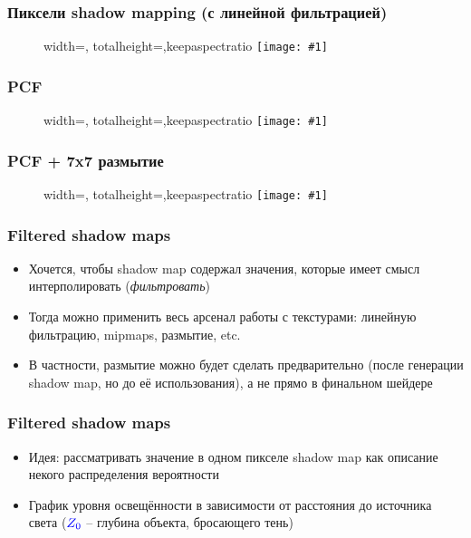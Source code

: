\documentclass[10pt]{beamer}
\newcommand{\slideimage}[1]{
  \begin{figure}
    \begin{adjustbox}{width=\textwidth, totalheight=\textheight-2\baselineskip-2\baselineskip,keepaspectratio}
      \texttt{[image: \#1]}
    \end{adjustbox}
  \end{figure}
}
\begin{document}
\begin{frame}[fragile]
\frametitle{Пиксели shadow mapping (с линейной фильтрацией)}
\slideimage{shadow_map_linear.png}
\end{frame}

\begin{frame}[fragile]
\frametitle{PCF}
\slideimage{pcf.png}
\end{frame}

\begin{frame}[fragile]
\frametitle{PCF + 7x7 размытие}
\slideimage{pcf_gauss.png}
\end{frame}

\begin{frame}[fragile]
\frametitle{Filtered shadow maps}
\begin{itemize}
\item Хочется, чтобы shadow map содержал значения, которые имеет смысл интерполировать (\textit{фильтровать})
\pause
\item Тогда можно применить весь арсенал работы с текстурами: линейную фильтрацию, mipmaps, размытие, etc.
\pause
\item В частности, размытие можно будет сделать предварительно (после генерации shadow map, но до её использования), а не прямо в финальном шейдере
\end{itemize}
\end{frame}

\begin{frame}[fragile]
\frametitle{Filtered shadow maps}
\begin{itemize}
\item Идея: рассматривать значение в одном пикселе shadow map как описание некого распределения вероятности
\pause
\item График уровня освещённости в зависимости от расстояния до источника света (\begin{math}\color{blue}Z_0\end{math} -- глубина объекта, бросающего тень)
\end{itemize}
\begin{center}
\end{center}
\end{frame}
\end{document}
